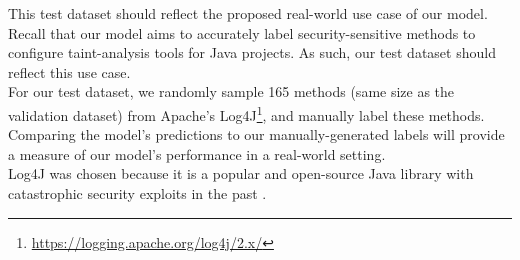 \noindent
This test dataset should reflect the proposed real-world use case of our model. Recall that our model aims to accurately label security-sensitive methods to configure taint-analysis tools for Java projects. As such, our test dataset should reflect this use case. \\

\noindent
For our test dataset, we randomly sample 165 methods (same size as the validation dataset) from Apache's Log4J\footnote{\url{https://logging.apache.org/log4j/2.x/}}, and manually label these methods. Comparing the model's predictions to our manually-generated labels will provide a measure of our model's performance in a real-world setting. \\

\noindent
Log4J was chosen because it is a popular and open-source Java library with catastrophic security exploits in the past \cite{log4shell}. \\

